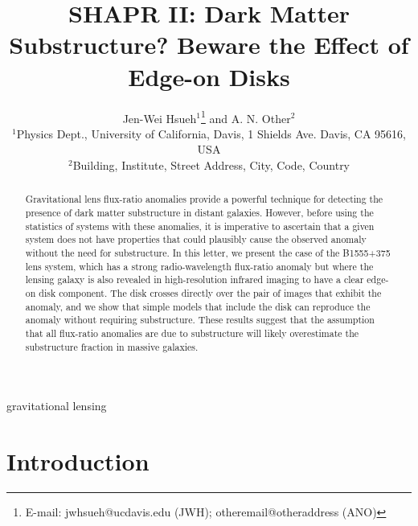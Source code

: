\documentclass[useAMS,usenatbib]{mnras}
\title[Beware the Effect of Edge-on Disks]{
SHAPR II: Dark Matter Substructure? Beware the Effect of Edge-on Disks
}
\author[Hsueh et al.]{Jen-Wei Hsueh$^{1}$\thanks{E-mail:
jwhsueh@ucdavis.edu (JWH); otheremail@otheraddress (ANO)} and A. N.
Other$^{2}$\\
$^{1}$Physics Dept., University of California, Davis, 1 Shields Ave.
Davis, CA 95616, USA\\
$^{2}$Building, Institute, Street Address, City, Code, Country}
\begin{document}

\pagerange{\pageref{firstpage}--\pageref{lastpage}} 

\maketitle

\label{firstpage}

\begin{abstract}

Gravitational lens flux-ratio anomalies provide a powerful technique
for detecting the presence of dark matter substructure in distant
galaxies.  However, before using the statistics of systems with these
anomalies, it is imperative to ascertain that a given system does not
have properties that could plausibly cause the observed anomaly
without the need for substructure.  In this letter, we present the
case of the B1555+375 lens system, which has a strong radio-wavelength
flux-ratio anomaly but where the lensing galaxy is also revealed in
high-resolution infrared imaging to have a clear edge-on disk component.  The
disk crosses directly over the pair of images that exhibit the
anomaly, and we show that simple models that include the disk can
reproduce the anomaly without requiring substructure.  
These results suggest that the assumption that
all flux-ratio anomalies are due to substructure will likely overestimate
the substructure fraction in massive galaxies.

\end{abstract}

\begin{keywords}
gravitational lensing
\end{keywords}

\section{Introduction}
\end{document}
